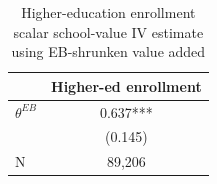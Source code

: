 \begin{table}[!htbp]
\centering
\caption{Higher-education enrollment scalar school-value IV estimate using EB-shrunken value added}
\label{tab:scalar_school_value_iv_higher_ed_enrollment_expected_va_eb}
\begin{tabular}{lc}
\toprule
 & Higher-ed enrollment \\
\midrule
$\theta^{EB}$ & 0.637*** \\
 & (0.145) \\
N & 89,206 \\
\bottomrule
\end{tabular}
\end{table}
